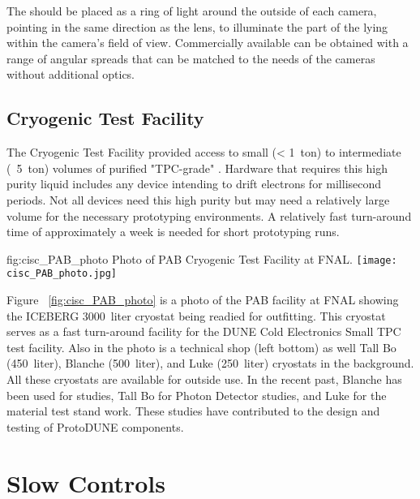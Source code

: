 The  should be placed as a ring of light around the outside of each
camera, pointing in the same direction as the lens, to 
illuminate the part of the  lying within the camera's field of
view. Commercially available  can be obtained with
a range of angular spreads that can be matched to the needs of the
cameras without additional optics.


\subsection{Cryogenic Test Facility}

The Cryogenic Test Facility provided access to small (< \SI {1} {ton}) to intermediate (~\SI {5} {ton}) volumes of purified "TPC-grade" . Hardware that requires this high purity liquid includes any device intending to drift electrons for millisecond periods. Not all devices need this high purity  but may need a relatively large volume for the necessary prototyping environments. A relatively fast turn-around time of approximately a week is needed for short prototyping runs. 

\begin{dunefigure}{fig:cisc_PAB_photo}
  {Photo of PAB Cryogenic Test Facility at FNAL.}
  \texttt{[image: cisc\_PAB\_photo.jpg]}
\end{dunefigure}

Figure ~\ref{fig:cisc_PAB_photo} is a photo of the PAB facility at FNAL showing the ICEBERG \SI {3000} {liter} cryostat being readied for outfitting. This cryostat serves as a fast turn-around facility for the DUNE Cold Electronics Small TPC test facility. Also in the photo is a technical shop (left bottom) as well Tall Bo (\SI {450} {liter}), Blanche (\SI {500} {liter}), and Luke (\SI {250} {liter}) cryostats in the background. All these cryostats are available for outside use. In the recent past, Blanche has been used for  studies, Tall Bo for Photon Detector studies, and Luke for the material test stand work. These studies have contributed to the design and testing of ProtoDUNE  components.



\section{Slow Controls}

